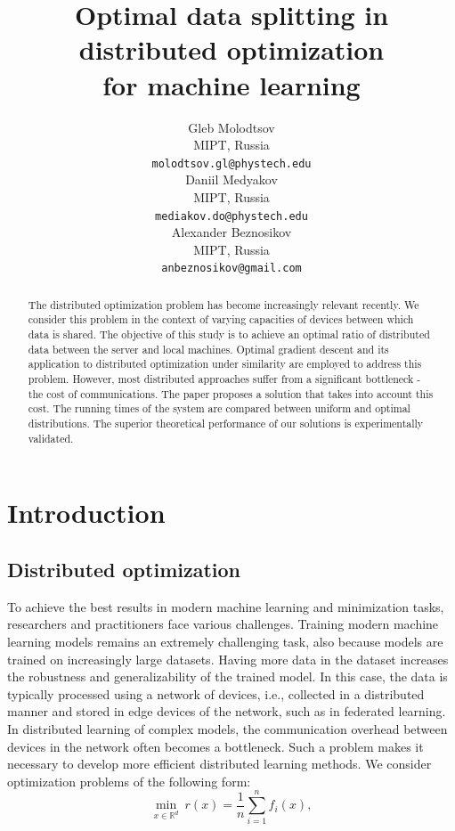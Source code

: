 \documentclass{article}
\title{Optimal data splitting in distributed optimization \\for machine learning}
\author{Gleb Molodtsov
    \\
	MIPT, Russia\\
	\texttt{molodtsov.gl@phystech.edu} \\
	\And
	Daniil Medyakov \\
	MIPT, Russia\\
	\texttt{mediakov.do@phystech.edu} \\
 \And
	Alexander Beznosikov \\
	MIPT, Russia\\
	\texttt{anbeznosikov@gmail.com} \\
}
\date{}
\begin{document}
\maketitle

\begin{abstract}
The distributed optimization problem has become increasingly relevant recently. We consider this problem in the context of varying capacities of devices between which data is shared. The objective of this study is to achieve an optimal ratio of distributed data between the server and local machines. Optimal gradient descent and its application to distributed optimization under similarity are employed to address this problem. However, most distributed approaches suffer from a significant bottleneck - the cost of communications. The paper proposes a solution that takes into account this cost. The running times of the system are compared between uniform and optimal distributions. The superior theoretical performance of our solutions is experimentally validated.
\end{abstract}




\section{Introduction}

\subsection{Distributed optimization}

To achieve the best results in modern machine learning and minimization tasks, researchers and practitioners face various challenges. Training modern machine learning models remains an extremely challenging task, also because models are trained on increasingly large datasets. Having more data in the dataset increases the robustness and generalizability of the trained model. In this case, the data is typically processed using a network of devices, i.e., collected in a distributed manner and stored in edge devices of the network, such as in federated learning. In distributed learning of complex models, the communication overhead between devices in the network often becomes a bottleneck. Such a problem makes it necessary to develop more efficient distributed learning methods. We consider optimization problems of the following form:
\begin{equation}
    \label{eq:1}
    \underset{x\in \mathbb{R}^d}{\min} ~ r(x) = \frac{1}{n} \sum \limits_{i = 1}^{n} f _i(x),
\end{equation}
\end{document}
